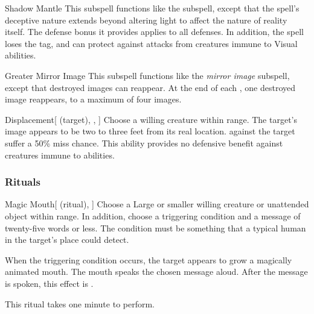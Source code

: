\begin{ability}[\nth{3}]{Shadow Mantle}
This subspell functions like the  subspell, except that the spell's deceptive nature extends beyond altering light to affect the nature of reality itself.
The defense bonus it provides applies to all defenses.
In addition, the spell loses the  tag, and can protect against attacks from creatures immune to Visual abilities.
\end{ability}
\vspace{0.25em}



\begin{ability}[\nth{4}]{Greater Mirror Image}
This subspell functions like the \textit{mirror image} subspell, except that destroyed images can reappear.
At the end of each , one destroyed image reappears, to a maximum of four images.
\end{ability}
\vspace{0.25em}



\begin{ability}[\nth{6}]{Displacement}[ (target), , ]
Choose a willing creature within \rngmed range.
The target's image appears to be two to three feet from its real location.
  against the target suffer a 50\% miss chance.
This ability provides no defensive benefit against creatures immune to  abilities.
\end{ability}
\vspace{0.25em}



\subsubsection{Rituals}


\begin{ability}[\nth{1}]{Magic Mouth}[ (ritual), ]
Choose a Large or smaller willing creature or unattended object within \rngclose range.
In addition, choose a triggering condition and a message of twenty-five words or less.
The condition must be something that a typical human in the target's place could detect.

When the triggering condition occurs, the target appears to grow a magically animated mouth.
The mouth speaks the chosen message aloud.
After the message is spoken, this effect is .

This ritual takes one minute to perform.
\end{ability}
\vspace{0.25em}



